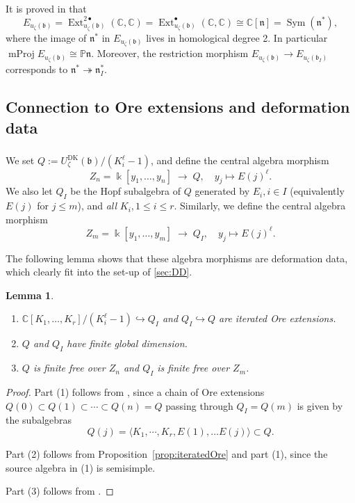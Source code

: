 \documentclass{amsart}
\numberwithin{equation}{section}
\newtheorem{lemma}[subsubsection]{Lemma}
\theoremstyle{definition}
\theoremstyle{remark}
\newcommand{\Sym}{\operatorname{Sym}}
\newcommand{\bk}{\Bbbk}
\newcommand{\tto}{\twoheadrightarrow}
\newcommand{\Ext}{\operatorname{Ext}}
\newcommand{\mProj}{\operatorname{mProj}}
\newcommand{\mP}{\mathbb{P}}
\newcommand{\fb}{\mathfrak{b}}
\newcommand{\fn}{\mathfrak{n}}
\newcommand{\mC}{\mathbb{C}}
\newcommand{\DK}{\mathrm{DK}}
\begin{document}
\subsubsection{}\label{sec:cohomb} It is proved in \cite[Theorem~2.5]{GK} that
\[E_{u_\zeta(\fb)}=\Ext^{2\bullet}_{u_\zeta(\fb)}(\mC,\mC)=\Ext^{\bullet}_{u_\zeta(\fb)}(\mC,\mC)\cong\mC[\fn]=\Sym(\fn^\ast),\]
where the image of $\fn^\ast$ in $E_{u_\zeta(\fb)}$ lives in homological degree 2. In particular $\mProj E_{u_\zeta(\fb)}\cong \mP\fn$. Moreover, the restriction morphism $E_{u_\zeta(\fb)}\to E_{u_\zeta(\fb_I)}$ corresponds to $\fn^\ast\tto \fn^\ast_I$.



\subsection{Connection to Ore extensions and deformation data}


\subsubsection{}\label{def:Qb} We set $Q:=U_{\zeta}^{\DK}(\fb)/(K_i^{\ell}-1)$, and define the central algebra morphism
\[Z_n=\bk[y_1,\ldots, y_n]\;\to\; Q,\quad y_j\mapsto E(j)^{\ell}.\]
We also let $Q_I$ be the Hopf subalgebra of $Q$ generated by $E_i,i\in I$ (equivalently $E(j)$ for $j\le m$), and \emph{all} $K_i, 1\le i\le r$.
Similarly, we define the central algebra morphism
\[Z_m=\bk[y_1,\ldots, y_m]\;\to\; Q_I,\quad y_j\mapsto E(j)^{\ell}.\]

The following lemma shows that these algebra morphisms are deformation data, which clearly fit into the set-up of \ref{sec:DD}.
\begin{lemma}
\begin{enumerate}
\item $\mC[K_1,\ldots, K_{r}]/(K_i^{\ell}-1)\hookrightarrow Q_I$ and $Q_I\hookrightarrow Q$ are iterated Ore extensions.
\item $Q$ and $Q_I$ have finite global dimension.
\item $Q$ is finite free over $Z_n$ and $Q_I$ is finite free over $Z_m$.
\end{enumerate}
\end{lemma}
\begin{proof}
Part (1) follows from \cite[\S 1.7]{DK}, since a chain of Ore extensions $Q(0)\subset Q(1)\subset \cdots\subset Q(n)=Q$ passing through $Q_I=Q(m)$ is given by the subalgebras
\[Q(j)=\langle K_1,\cdots, K_r, E(1),\ldots E(j)\rangle \subset Q. \] 


Part (2) follows from Proposition~\ref{prop:iteratedOre} and part (1), since the source algebra in (1) is semisimple.

Part (3) follows from \cite[Corollary~3.3]{DK}.
\end{proof}
\end{document}
